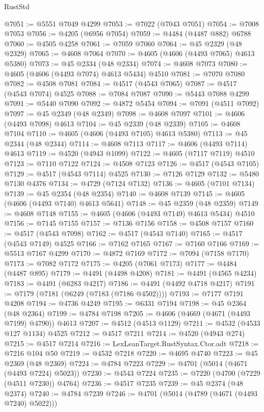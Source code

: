 \begin{lexlean}{RustStd}
\begin{coremodule}
@7051 := @5551 @7049 @4299
@7053 := @7022 (@7043 @7051)
@7054 := @7008 @7053
@7056 := @4205 (@6956 @7054)
@7059 := @4484 (@4487 @882) @6788
@7060 := @4505 @4258
@7061 := @7059 @7060
@7064 := @45 @2329 (@48 @2329)
@7065 := @4608 @7064
@7070 := @4605 (@4606 (@4493 @7065) @4613 @5380)
@7073 := @45 @2334 (@48 @2334)
@7074 := @4608 @7073
@7080 := @4605 (@4606 (@4493 @7074) @4613 @5434) @4510
@7081 := @7070 @7080
@7082 := @4508 @7081
@7084 := @4517 (@4543 @7065)
@7087 := @4517 (@4543 @7074) @4525
@7088 := @7084 @7087
@7090 := @5443 @7088 @4299
@7091 := @5440 @7090
@7092 := @4872 @5454
@7094 := @7091 (@4511 @7092)
@7097 := @45 @2349 (@48 @2349)
@7098 := @4608 @7097
@7101 := @4606 (@4493 @7098) @4613
@7104 := @45 @2339 (@48 @2339)
@7105 := @4608 @7104
@7110 := @4605 (@4606 (@4493 @7105) @4613 @5380)
@7113 := @45 @2344 (@48 @2344)
@7114 := @4608 @7113
@7117 := @4606 (@4493 @7114) @4613
@7119 := @4520 (@4943 @1099)
@7122 := @4605 (@7117 @7119) @4510
@7123 := @7110 @7122
@7124 := @4508 @7123
@7126 := @4517 (@4543 @7105)
@7129 := @4517 (@4543 @7114) @4525
@7130 := @7126 @7129
@7132 := @5480 @7130 @4376
@7134 := @4729 (@7124 @7132)
@7136 := @4605 (@7101 @7134)
@7139 := @45 @2354 (@48 @2354)
@7140 := @4608 @7139
@7145 := @4605 (@4606 (@4493 @7140) @4613 @5641)
@7148 := @45 @2359 (@48 @2359)
@7149 := @4608 @7148
@7155 := @4605 (@4606 (@4493 @7149) @4613 @5434) @4510
@7156 := @7145 @7155
@7157 := @7136 @7156
@7158 := @4508 @7157
@7160 := @4517 (@4543 @7098)
@7162 := @4517 (@4543 @7140)
@7165 := @4517 (@4543 @7149) @4525
@7166 := @7162 @7165
@7167 := @7160 @7166
@7169 := @5513 @7167 @4299
@7170 := @4872 @7169
@7172 := @7094 (@7158 @7170)
@7173 := @7082 @7172
@7175 := @4205 (@7061 @7173)
@7177 := @4484 (@4487 @895)
@7179 := @4491 (@4498 @4208)
@7181 := @4491 (@4565 @4234)
@7183 := @4491 (@6283 @4217)
@7186 := @4491 (@4492 @4718 @4217)
@7191 := @7179 (@7181 (@6249 (@7183 (@7186 @4502))))
@7193 := @7177 @7191 @4208
@7194 := @4736 @4249
@7195 := @6331 @7194
@7198 := @45 @2364 (@48 @2364)
@7199 := @4784 @7198
@7205 := @4606 (@4669 (@4671 (@4493 @7199) @4790)) @4613
@7207 := @4512 (@4513 @1129)
@7211 := @4532 (@4533 @127 @1134) @4525
@7212 := @4517 @7211
@7214 := @4520 (@4943 @274)
@7215 := @4517 @7214
@7216 := LexLeanTarget.RustSyntax.Ctor.adt
@7218 := @7216 @104 @50
@7219 := @4532 @7218
@7220 := @4695 @4740
@7223 := @45 @2369 (@48 @2369)
@7224 := @4784 @7223
@7229 := @4701 (@5014 (@4671 (@4493 @7224) @5023))
@7230 := @4543 @7224
@7235 := @7220 (@4700 (@7229 (@4511 @7230)) @4764)
@7236 := @4517 @7235
@7239 := @45 @2374 (@48 @2374)
@7240 := @4784 @7239
@7246 := @4701 (@5014 (@4789 (@4671 (@4493 @7240) @5022)))

\end{coremodule}
\end{lexlean}
